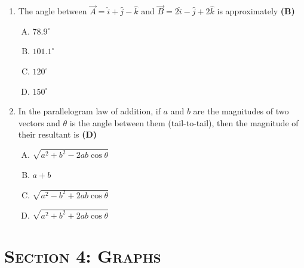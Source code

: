 \documentclass[10pt,a4paper]{article}
\newcommand{\topic}[1]{\section*{\large\textsc{#1}}}
\begin{document}
\begin{enumerate}[1.]
\item The angle between $\vec{A} = \hat{i}+\hat{j}-\hat{k}$ and $\vec{B} = 2\hat{i}-\hat{j}+2\hat{k}$ is approximately \hfill \textbf{(B)}
\begin{enumerate}[(A)]
    \item $78.9^\circ$
    \item $101.1^\circ$
    \item $120^\circ$
    \item $150^\circ$
\end{enumerate}

\item In the parallelogram law of addition, if $a$ and $b$ are the magnitudes of two vectors and $\theta$ is the angle between them (tail-to-tail), then the magnitude of their resultant is \hfill \textbf{(D)}
\begin{enumerate}[(A)]
    \item $\sqrt{a^2 + b^2 - 2ab\cos\theta}$
    \item $a + b$
    \item $\sqrt{a^2 - b^2 + 2ab\cos\theta}$
    \item $\sqrt{a^2 + b^2 + 2ab\cos\theta}$
\end{enumerate}

\end{enumerate}

\newpage
\topic{Section 4: Graphs}
\end{document}
